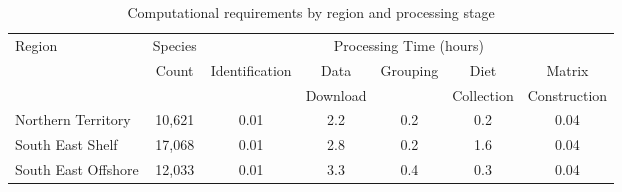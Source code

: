 \begin{table}[htbp]
    \centering
    \footnotesize
    \caption{Computational requirements by region and processing stage}
    \label{tab:timing_analysis}
    \begin{tabular}{lcccccc}
    \hline
    Region & Species & \multicolumn{5}{c}{Processing Time (hours)} \\
    \cline{3-7}
     & Count & Identification & Data & Grouping & Diet & Matrix \\
     & & & Download & & Collection & Construction \\
    \hline
    Northern Territory & 10,621 & 0.01 & 2.2 & 0.2 & 0.2 & 0.04 \\
    South East Shelf & 17,068 & 0.01 & 2.8 & 0.2 & 1.6 & 0.04 \\
    South East Offshore & 12,033 & 0.01 & 3.3 & 0.4 & 0.3 & 0.04 \\
    \hline
    \end{tabular}
    \vspace{1ex}
    \end{table}
    